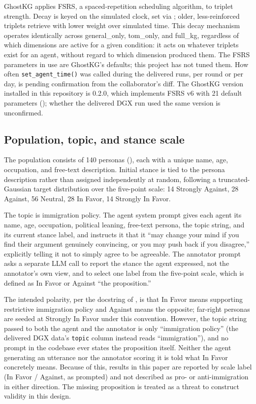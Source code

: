 \documentclass[11pt,a4paper]{article}
\newcommand{\cond}[1]{\textsf{#1}}
\begin{document}
GhostKG applies FSRS, a spaced-repetition scheduling algorithm, to triplet strength. Decay is keyed on the simulated clock, set via ; older, less-reinforced triplets retrieve with lower weight over simulated time. This decay mechanism operates identically across \cond{general\_only}, \cond{tom\_only}, and \cond{full\_kg}, regardless of which dimensions are active for a given condition: it acts on whatever triplets exist for an agent, without regard to which dimension produced them. The FSRS parameters in use are GhostKG's defaults; this project has not tuned them. How often \texttt{set\_agent\_time()} was called during the delivered runs, per round or per day, is pending confirmation from the collaborator's diff. The GhostKG version installed in this repository is 0.2.0, which implements FSRS v6 with 21 default parameters (); whether the delivered DGX run used the same version is unconfirmed.

\subsection{Population, topic, and stance scale}\label{sec:3.5}

The population consists of 140 personas (), each with a unique name, age, occupation, and free-text description. Initial stance is tied to the persona description rather than assigned independently at random, following a truncated-Gaussian target distribution over the five-point scale: 14 Strongly Against, 28 Against, 56 Neutral, 28 In Favor, 14 Strongly In Favor.

The topic is immigration policy. The agent system prompt gives each agent its name, age, occupation, political leaning, free-text persona, the topic string, and its current stance label, and instructs it that it ``may change your mind if you find their argument genuinely convincing, or you may push back if you disagree,'' explicitly telling it not to simply agree to be agreeable. The annotator prompt asks a separate LLM call to report the stance the agent expressed, not the annotator's own view, and to select one label from the five-point scale, which is defined as In Favor or Against ``the proposition.''

The intended polarity, per the docstring of , is that In Favor means supporting restrictive immigration policy and Against means the opposite; far-right personas are seeded at Strongly In Favor under this convention. However, the topic string passed to both the agent and the annotator is only ``immigration policy'' (the delivered DGX data's \texttt{topic} column instead reads ``immigration''), and no prompt in the codebase ever states the proposition itself. Neither the agent generating an utterance nor the annotator scoring it is told what In Favor concretely means. Because of this, results in this paper are reported by scale label (In Favor / Against, as prompted) and not described as pro- or anti-immigration in either direction. The missing proposition is treated as a threat to construct validity in this design.
\end{document}
